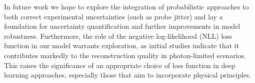 \documentclass[sn-mathphys]{sn-jnl}%
\theoremstyle{thmstyleone}%
\theoremstyle{thmstyletwo}%
\theoremstyle{thmstylethree}%
\begin{document}
In future work we hope to explore the integration of probabilistic approaches to both correct experimental uncertainties (such as probe jitter) and lay a foundation for uncertainty quantification and further improvements in model robustness. Furthermore, the role of the negative log-likelihood (NLL) loss function in our model warrants exploration, as initial studies indicate that it contributes markedly to the reconstruction quality in photon-limited scenarios. This raises the significance of an appropriate choice of loss function in deep learning approaches, especially those that aim to incorporate physical principles. 
















\end{document}
